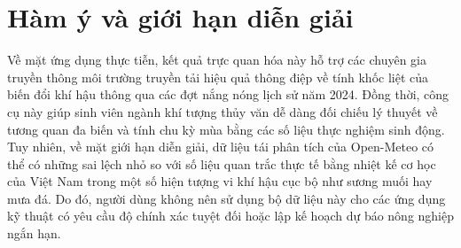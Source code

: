 \section{Hàm ý và giới hạn diễn giải}
Về mặt ứng dụng thực tiễn, kết quả trực quan hóa này hỗ trợ các chuyên gia truyền thông môi trường truyền tải hiệu quả thông điệp về tính khốc liệt của biến đổi khí hậu thông qua các đợt nắng nóng lịch sử năm 2024. Đồng thời, công cụ này giúp sinh viên ngành khí tượng thủy văn dễ dàng đối chiếu lý thuyết về tương quan đa biến và tính chu kỳ mùa bằng các số liệu thực nghiệm sinh động. Tuy nhiên, về mặt giới hạn diễn giải, dữ liệu tái phân tích của Open-Meteo có thể có những sai lệch nhỏ so với số liệu quan trắc thực tế bằng nhiệt kế cơ học của Việt Nam trong một số hiện tượng vi khí hậu cục bộ như sương muối hay mưa đá. Do đó, người dùng không nên sử dụng bộ dữ liệu này cho các ứng dụng kỹ thuật có yêu cầu độ chính xác tuyệt đối hoặc lập kế hoạch dự báo nông nghiệp ngắn hạn.

